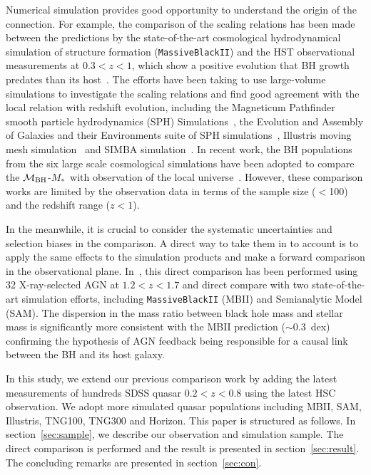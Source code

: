 \documentclass[twocolumn]{aastex631}
\def\smass{{$M_*$}}
\def\mbh{$\mathcal M_{\rm BH}$}
\begin{document}
Numerical simulation provides good opportunity to understand the origin of the connection. For example, the comparison of the scaling relations has been made between the predictions by the state-of-the-art cosmological hydrodynamical simulation of structure formation ({\tt MassiveBlackII}) and the HST observational measurements at  $0.3<z<1$, which show a positive evolution that BH growth predates than its host~\citep{DeG++15}. The efforts have been taking to use large-volume simulations to investigate the scaling relations and find good agreement with the local relation with redshift evolution, including the Magneticum Pathfinder smooth particle hydrodynamics (SPH) Simulations~\citep{Steinborn2015}, the Evolution and Assembly of Galaxies and their Environments suite of SPH simulations~\citep{Schaye2015}, Illustris moving mesh simulation~\citep{Sijacki2015, Vogelsberger2014, Li2019} and SIMBA simulation~\citep{Thomas2019}. In recent work, the BH populations from the six large scale cosmological simulations have been adopted to compare the \mbh-\smass\ with observation of the local universe~\citep{Habouzit2021}. However, these comparison works are limited by the observation data in terms of the sample size ($<$100) and the redshift range ($z<1$).

In the meanwhile, it is crucial to consider the systematic uncertainties and selection biases in the comparison. A direct way to take them in to account is to apply the same effects to the simulation products and make a forward comparison in the observational plane. 
In~\citet{Ding2020b}, this direct comparison has been performed using 32 X-ray-selected AGN at $1.2<z<1.7$ and direct compare with two state-of-the-art simulation efforts, including {\tt MassiveBlackII} (MBII) and Semianalytic Model (SAM). The dispersion in the mass ratio between black hole mass and stellar mass is significantly more consistent with the MBII prediction ($\sim0.3$~dex) confirming the hypothesis of AGN feedback being responsible for a causal link between the BH and its host galaxy.

In this study, we extend our previous comparison work by adding the latest measurements of hundreds SDSS quasar $0.2<z<0.8$ using the latest HSC observation. We adopt more simulated quasar populations including MBII, SAM, Illustris, TNG100, TNG300 and Horizon. This paper is structured as follows. In section~\ref{sec:sample}, we describe our observation and simulation sample. The direct comparison is performed and the result is presented in section~\ref{sec:result}. The concluding remarks are presented in section~\ref{sec:con}.
\end{document}
